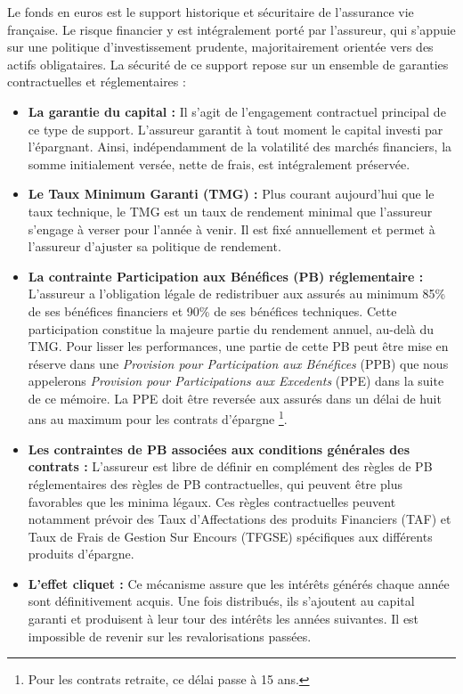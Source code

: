 Le fonds en euros est le support historique et sécuritaire de l'assurance vie française. Le risque financier y est intégralement porté par l'assureur, qui s'appuie sur une politique d'investissement prudente, majoritairement orientée vers des actifs obligataires. La sécurité de ce support repose sur un ensemble de garanties contractuelles et réglementaires :
\begin{itemize}
    \item \textbf{La garantie du capital :} Il s'agit de l'engagement contractuel principal de ce type de support. L'assureur garantit à tout moment le capital investi par l'épargnant. Ainsi, indépendamment de la volatilité des marchés financiers, la somme initialement versée, nette de frais, est intégralement préservée.
    \item \textbf{Le Taux Minimum Garanti (TMG) :} Plus courant aujourd'hui que le taux technique, le TMG est un taux de rendement minimal que l'assureur s'engage à verser pour l'année à venir. Il est fixé annuellement et permet à l'assureur d'ajuster sa politique de rendement.
    \item \textbf{La contrainte Participation aux Bénéfices (PB) réglementaire :} L'assureur a l'obligation légale de redistribuer aux assurés au minimum 85\% de ses bénéfices financiers et 90\% de ses bénéfices techniques. Cette participation constitue la majeure partie du rendement annuel, au-delà du TMG. Pour lisser les performances, une partie de cette PB peut être mise en réserve dans une \textit{Provision pour Participation aux Bénéfices} (PPB) que nous appelerons \textit{Provision pour Participations aux Excedents} (PPE) dans la suite de ce mémoire. La PPE doit être reversée aux assurés dans un délai de huit ans au maximum pour les contrats d'épargne \footnote{Pour les contrats retraite, ce délai passe à 15 ans.}.
    \item \textbf{Les contraintes de PB associées aux conditions générales des contrats :} L'assureur est libre de définir en complément des règles de PB réglementaires des règles de PB contractuelles, qui peuvent être plus favorables que les minima légaux. Ces règles contractuelles peuvent notamment prévoir des Taux d'Affectations des produits Financiers (TAF) et Taux de Frais de Gestion Sur Encours (TFGSE) spécifiques aux différents produits d'épargne.
    \item \textbf{L'effet cliquet :} Ce mécanisme assure que les intérêts générés chaque année sont définitivement acquis. Une fois distribués, ils s'ajoutent au capital garanti et produisent à leur tour des intérêts les années suivantes. Il est impossible de revenir sur les revalorisations passées.
\end{itemize}


